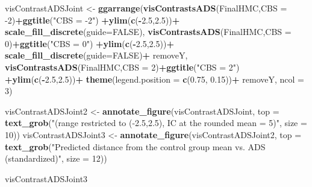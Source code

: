 \documentclass[10pt,dvipsnames,enabledeprecatedfontcommands]{scrartcl}
\newenvironment{Shaded}{\begin{snugshade}}{\end{snugshade}}
\newcommand{\KeywordTok}[1]{\textcolor[rgb]{0.13,0.29,0.53}{\textbf{#1}}}
\newcommand{\DataTypeTok}[1]{\textcolor[rgb]{0.13,0.29,0.53}{#1}}
\newcommand{\DecValTok}[1]{\textcolor[rgb]{0.00,0.00,0.81}{#1}}
\newcommand{\FloatTok}[1]{\textcolor[rgb]{0.00,0.00,0.81}{#1}}
\newcommand{\StringTok}[1]{\textcolor[rgb]{0.31,0.60,0.02}{#1}}
\newcommand{\OtherTok}[1]{\textcolor[rgb]{0.56,0.35,0.01}{#1}}
\newcommand{\OperatorTok}[1]{\textcolor[rgb]{0.81,0.36,0.00}{\textbf{#1}}}
\newcommand{\NormalTok}[1]{#1}
\begin{document}
\begin{Shaded}
\begin{Highlighting}[]
\NormalTok{visContrastADSJoint <-}\StringTok{ }\KeywordTok{ggarrange}\NormalTok{(}\KeywordTok{visContrastsADS}\NormalTok{(FinalHMC,}\DataTypeTok{CBS =} \DecValTok{-2}\NormalTok{)}\OperatorTok{+}\KeywordTok{ggtitle}\NormalTok{(}\StringTok{"CBS = -2"}\NormalTok{)}
                                 \OperatorTok{+}\KeywordTok{ylim}\NormalTok{(}\KeywordTok{c}\NormalTok{(}\OperatorTok{-}\FloatTok{2.5}\NormalTok{,}\FloatTok{2.5}\NormalTok{))}\OperatorTok{+}\StringTok{ }\KeywordTok{scale_fill_discrete}\NormalTok{(}\DataTypeTok{guide=}\OtherTok{FALSE}\NormalTok{),}
                                 \KeywordTok{visContrastsADS}\NormalTok{(FinalHMC,}\DataTypeTok{CBS =} \DecValTok{0}\NormalTok{)}\OperatorTok{+}\KeywordTok{ggtitle}\NormalTok{(}\StringTok{"CBS = 0"}\NormalTok{)}
                                 \OperatorTok{+}\KeywordTok{ylim}\NormalTok{(}\KeywordTok{c}\NormalTok{(}\OperatorTok{-}\FloatTok{2.5}\NormalTok{,}\FloatTok{2.5}\NormalTok{))}\OperatorTok{+}\StringTok{ }\KeywordTok{scale_fill_discrete}\NormalTok{(}\DataTypeTok{guide=}\OtherTok{FALSE}\NormalTok{)}\OperatorTok{+}
\StringTok{                                   }\NormalTok{removeY,}
                                 \KeywordTok{visContrastsADS}\NormalTok{(FinalHMC,}\DataTypeTok{CBS =} \DecValTok{2}\NormalTok{)}\OperatorTok{+}\KeywordTok{ggtitle}\NormalTok{(}\StringTok{"CBS = 2"}\NormalTok{)}
                                 \OperatorTok{+}\KeywordTok{ylim}\NormalTok{(}\KeywordTok{c}\NormalTok{(}\OperatorTok{-}\FloatTok{2.5}\NormalTok{,}\FloatTok{2.5}\NormalTok{))}\OperatorTok{+}
\StringTok{                                   }\KeywordTok{theme}\NormalTok{(}\DataTypeTok{legend.position =} \KeywordTok{c}\NormalTok{(}\FloatTok{0.75}\NormalTok{, }\FloatTok{0.15}\NormalTok{))}\OperatorTok{+}
\StringTok{                                   }\NormalTok{removeY, }\DataTypeTok{ncol =} \DecValTok{3}\NormalTok{)}

\NormalTok{visContrastADSJoint2 <-}\StringTok{ }\KeywordTok{annotate_figure}\NormalTok{(visContrastADSJoint, }
\DataTypeTok{top =} \KeywordTok{text_grob}\NormalTok{(}\StringTok{"(range restricted to (-2.5,2.5), IC at the rounded mean = 5)"}\NormalTok{,}
                                                        \DataTypeTok{size =} \DecValTok{10}\NormalTok{))}
\NormalTok{visContrastADSJoint3 <-}\StringTok{ }\KeywordTok{annotate_figure}\NormalTok{(visContrastADSJoint2, }
\DataTypeTok{top =} \KeywordTok{text_grob}\NormalTok{(}\StringTok{"Predicted distance from the control group mean vs. ADS (standardized)"}\NormalTok{,}
                                                        \DataTypeTok{size =} \DecValTok{12}\NormalTok{))}

\NormalTok{visContrastADSJoint3}
\end{Highlighting}
\end{Shaded}
\end{document}
